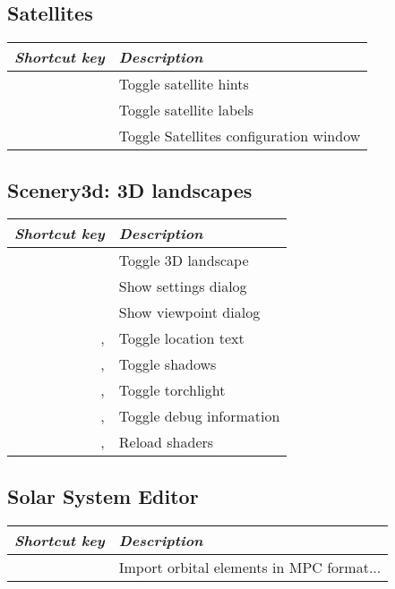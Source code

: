 \subsection{Satellites}
\label{ch:Hotkeys:Plugins:Satellites}
\begin{longtabu}to \textwidth {rl} 
\toprule
\emph{Shortcut key}	& \emph{Description}\\\midrule
{}		& Toggle satellite hints \\
	& Toggle satellite labels \\
			& Toggle Satellites configuration window \\
\bottomrule
\end{longtabu}

\subsection{Scenery3d: 3D landscapes}
\label{ch:Hotkeys:Plugins:Scenery3d}
\begin{longtabu}to \textwidth {rl} 
\toprule
\emph{Shortcut key}     & \emph{Description}\\\midrule
{}           & Toggle 3D landscape \\
     & Show settings dialog \\
       & Show viewpoint dialog \\
, 	& Toggle location text \\
, 	& Toggle shadows \\
, 	& Toggle torchlight \\
, 	& Toggle debug information \\
, 	& Reload shaders \\
\bottomrule
\end{longtabu}

\subsection{Solar System Editor}
\label{ch:Hotkeys:Plugins:SolarSystemEditor}
\begin{longtabu}to \textwidth {rl} 
\toprule
\emph{Shortcut key}	& \emph{Description}\\\midrule
{}	& Import orbital elements in MPC format... \\
\bottomrule
\end{longtabu}

